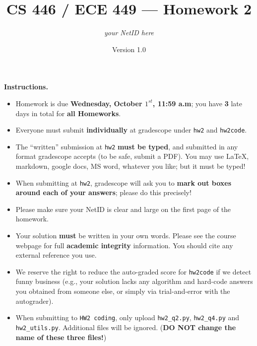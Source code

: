 \documentclass{article}
\title{CS 446 / ECE 449 --- Homework 2}
\author{\emph{your NetID here}}
\date{Version 1.0}
\theoremstyle{definition}
\theoremstyle{remark}
\begin{document}
        \maketitle

        \noindent\textbf{Instructions.}
        \begin{itemize}
          \item
            Homework is due \textbf{Wednesday, October $1^{st}$, 11:59 a.m}; you have \textbf{3} late days in total for \textbf{all Homeworks}.
        
          \item
            Everyone must submit \textbf{individually} at gradescope under \texttt{hw2} and \texttt{hw2code}.
        
          \item
            The ``written'' submission at \texttt{hw2} \textbf{must be typed}, and submitted in
            any format gradescope accepts (to be safe, submit a PDF).  You may use \LaTeX, markdown,
            google docs, MS word, whatever you like; but it must be typed!
        
          \item
            When submitting at \texttt{hw2}, gradescope will ask you to \textbf{mark out boxes
            around each of your answers}; please do this precisely!
        
          \item
            Please make sure your NetID is clear and large on the first page of the homework.
        
          \item
            Your solution \textbf{must} be written in your own words.
            Please see the course webpage for full \textbf{academic integrity} information.
            You should cite any external reference you use.
        
          \item
            We reserve the right to reduce the auto-graded score for
            \texttt{hw2code} if we detect funny business (e.g., your solution
            lacks any algorithm and hard-code answers you obtained from
            someone else, or simply via trial-and-error with the autograder).
            
          \item
           When submitting to \texttt{HW2 coding}, only upload \texttt{hw2\_q2.py}, \texttt{hw2\_q4.py} and \texttt{hw2\_utils.py}. Additional files will be ignored. (\textbf{DO NOT change the name of these three files!})
           
        \end{itemize}
\end{document}
